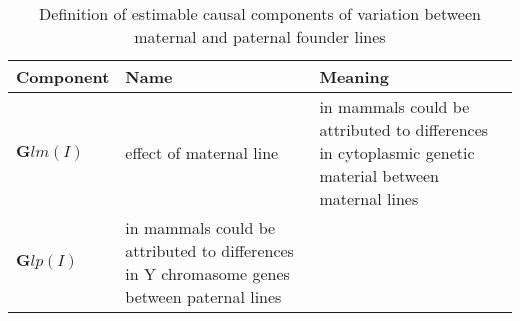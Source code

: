 \begin{table}
\centering
\caption{Definition of estimable causal components of variation between maternal and paternal founder lines}
\label{tab.line}
\vspace{0.1in}
\begin{tabular}{l|p{1.2in}|p{2.4in}}
Component & Name & Meaning \\ \hline
${\bm Glm(I)}$     & effect of maternal line &  in mammals could be attributed to differences in cytoplasmic genetic material between maternal lines  \\
${\bm Glp(I)}$     & in mammals could be attributed to differences in Y chromasome genes between paternal lines \\  \hline
\end{tabular}
\end{table}
